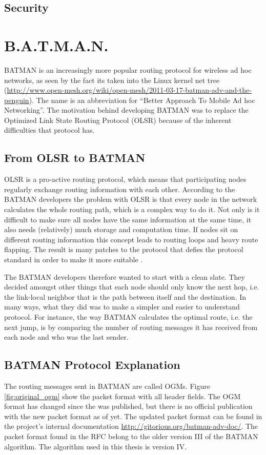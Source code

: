 \subsection{Security}

\section{B.A.T.M.A.N.}
BATMAN \cite{batman_rfc} is an increasingly more popular routing protocol for
wireless ad hoc networks, as seen by the fact its taken into the Linux kernel
net tree (\url{http://www.open-mesh.org/wiki/open-mesh/2011-03-17-batman-adv-and-the-penguin}).
The name is an abbreviation for ``Better Approach To Mobile Ad hoc Networking''.
The motivation behind developing BATMAN was to replace the Optimized Link State
Routing Protocol (OLSR) \cite{why-starting-batman} because of the inherent
difficulties that protocol has.

\subsection{From OLSR to BATMAN}
OLSR is a pro-active routing protocol, which means that participating nodes
regularly exchange routing information with each other. According to the BATMAN
developers the problem with OLSR is that every node in the network calculates
the whole routing path, which is a complex way to do it. Not only is it
difficult to make sure all nodes have the same information at the same time,
it also needs (relatively) much storage and computation time. If nodes sit on
different routing information this concept leads to routing loops and heavy
route flapping. The result is many patches to the protocol that defies the
protocol standard in order to make it more suitable \cite{why-starting-batman}.

The BATMAN developers therefore wanted to start with a clean slate. They decided
amongst other things that each node should only know the next hop, i.e. the
link-local neighbor that is the path between itself and the destination. In
many ways, what they did was to make a simpler and easier to understand
protocol. For instance, the way BATMAN calculates the optimal route, i.e. the
next jump, is by comparing the number of routing messages it has received from
each node and who was the last sender.

\subsection{BATMAN Protocol Explanation}
The routing messages sent in BATMAN are called \acp{OGM}. Figure
\ref{fig:original_ogm} show the packet format with all header fields. The
\ac{OGM} format has changed since the \cite{batman_rfc} was published, but there
is no official publication with the new packet format as of yet. The updated
packet format can be found in the project's internal documentation
\url{http://gitorious.org/batman-adv-doc/}. The packet format found in the RFC
belong to the older version III of the BATMAN algorithm. The algorithm used in
this thesis is version IV.

